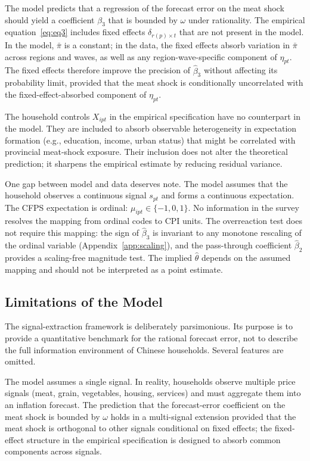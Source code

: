 The model predicts that a regression of the forecast error
on the meat shock should yield a coefficient $\beta_3$ that
is bounded by $\omega$ under rationality.
The empirical equation~\eqref{eq:eq3} includes fixed effects
$\delta_{r(p)\times t}$ that are not present in the model.
In the model, $\bar{\pi}$ is a constant; in the data, the
fixed effects absorb variation in $\bar{\pi}$ across regions
and waves, as well as any region-wave-specific component of
$\eta_{pt}$.
The fixed effects therefore improve the precision of
$\hat{\beta}_3$ without affecting its probability limit,
provided that the meat shock is conditionally uncorrelated
with the fixed-effect-absorbed component of $\eta_{pt}$.

The household controls $X_{ipt}$ in the empirical specification
have no counterpart in the model.
They are included to absorb observable heterogeneity in
expectation formation (e.g., education, income, urban status)
that might be correlated with provincial meat-shock exposure.
Their inclusion does not alter the theoretical prediction;
it sharpens the empirical estimate by reducing residual
variance.

One gap between model and data deserves note.
The model assumes that the household observes a continuous
signal $s_{pt}$ and forms a continuous expectation.
The CFPS expectation is ordinal: $\mu_{ipt} \in \{-1,0,1\}$.
No information in the survey resolves the mapping from
ordinal codes to CPI units.
The overreaction test does not require this mapping:
the sign of $\hat{\beta}_3$ is invariant to any monotone
rescaling of the ordinal variable
(Appendix~\ref{app:scaling}), and the pass-through coefficient
$\hat{\beta}_2$ provides a scaling-free magnitude test.
The implied $\hat{\theta}$ depends on the assumed mapping
and should not be interpreted as a point estimate.

\subsection{Limitations of the Model}

The signal-extraction framework is deliberately parsimonious.
Its purpose is to provide a quantitative benchmark for the
rational forecast error, not to describe the full
information environment of Chinese households.
Several features are omitted.

The model assumes a single signal.
In reality, households observe multiple price signals (meat,
grain, vegetables, housing, services) and must aggregate them
into an inflation forecast.
The prediction that the forecast-error coefficient on the meat
shock is bounded by $\omega$ holds in a multi-signal extension
provided that the meat shock is orthogonal to other signals
conditional on fixed effects; the fixed-effect structure in
the empirical specification is designed to absorb common
components across signals.

